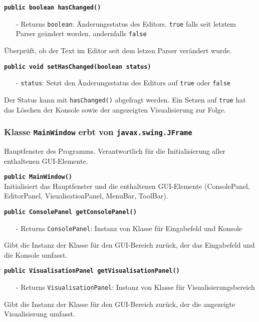 \documentclass[parskip=full,11pt,twoside]{scrartcl}
\begin{document}
\textbf{\texttt{public boolean hasChanged()}}
\begin{itemize}[noitemsep]
	\item[-] Returns \texttt{boolean}: Änderungsstatus des Editors. \texttt{true} falls seit letztem Parser geändert worden, andernfalls \texttt{false}
\end{itemize}
Überprüft, ob der Text im Editor seit dem letzen Parser verändert wurde.

\textbf{\texttt{public void setHasChanged(boolean status)}}
\begin{itemize}[noitemsep]
	\item[-] \texttt{status}: Setzt den Änderungsstatus des Editors auf \texttt{true} oder \texttt{false}
\end{itemize}
Der Status kann mit \texttt{hasChanged()} abgefragt werden. Ein Setzen auf \texttt{true} hat das Löschen der Konsole sowie der angezeigten Visualisierung zur Folge.

\subsubsection{Klasse \texttt{MainWindow} erbt von \texttt{javax.swing.JFrame}}

Hauptfenster des Programms. Verantwortlich für die Initialisierung aller enthaltenen GUI-Elemente.

\textbf{\texttt{public MainWindow()}}\\
Initialisiert das Hauptfenster und die enthaltenen GUI-Elemente (ConsolePanel, EditorPanel, VisualisationPanel, MenuBar, ToolBar).

\textbf{\texttt{public ConsolePanel getConsolePanel()}}
\begin{itemize}[noitemsep]
	\item[-] Returns \texttt{ConsolePanel}: Instanz von Klasse für Eingabefeld und Konsole
\end{itemize}
Gibt die Instanz der Klasse für den GUI-Bereich zurück, der das Eingabefeld und die Konsole umfasst.

\textbf{\texttt{public VisualisationPanel getVisualisationPanel()}}
\begin{itemize}[noitemsep]
	\item[-] Returns \texttt{VisualisationPanel}: Instanz von Klasse für Visualisierungsbereich
\end{itemize}
Gibt die Instanz der Klasse für den GUI-Bereich zurück, der die angezeigte Visualisierung umfasst.
\end{document}
